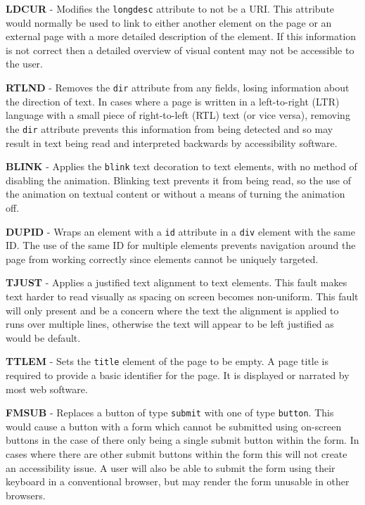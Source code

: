 \textbf{LDCUR} - Modifies the \texttt{longdesc} attribute to not be a URI. This attribute would normally be used to link to either another element on the page or an external page with a more detailed description of the element. If this information is not correct then a detailed overview of visual content may not be accessible to the user.

\textbf{RTLND} - Removes the \texttt{dir} attribute from any fields, losing information about the direction of text. In cases where a page is written in a left-to-right (LTR) language with a small piece of right-to-left (RTL) text (or vice versa), removing the \texttt{dir} attribute prevents this information from being detected and so may result in text being read and interpreted backwards by accessibility software.

\textbf{BLINK} - Applies the \texttt{blink} text decoration to text elements, with no method of disabling the animation. Blinking text prevents it from being read, so the use of the animation on textual content or without a means of turning the animation off.

\textbf{DUPID} - Wraps an element with a \texttt{id} attribute in a \texttt{div} element with the same ID. The use of the same ID for multiple elements prevents navigation around the page from working correctly since elements cannot be uniquely targeted.

\textbf{TJUST} - Applies a justified text alignment to text elements. This fault makes text harder to read visually as spacing on screen becomes non-uniform. This fault will only present and be a concern where the text the alignment is applied to runs over multiple lines, otherwise the text will appear to be left justified as would be default.

\textbf{TTLEM} - Sets the \texttt{title} element of the page to be empty. A page title is required to provide a basic identifier for the page. It is displayed or narrated by most web software.

\textbf{FMSUB} - Replaces a button of type \texttt{submit} with one of type \texttt{button}. This would cause a button with a form which cannot be submitted using on-screen buttons in the case of there only being a single submit button within the form. In cases where there are other submit buttons within the form this will not create an accessibility issue. A user will also be able to submit the form using their keyboard in a conventional browser, but may render the form unusable in other browsers.

